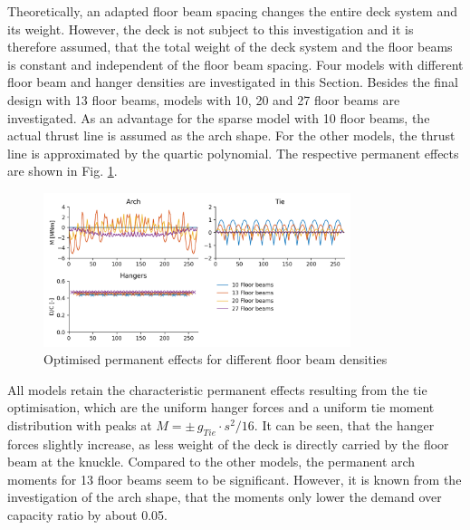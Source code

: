 Theoretically, an adapted floor beam spacing changes the entire deck system and its weight. However, the deck is not subject to this investigation and it is therefore assumed, that the total weight of the deck system and the floor beams is constant and independent of the floor beam spacing. Four models with different floor beam and hanger densities are investigated in this Section. Besides the final design with 13 floor beams, models with 10, 20 and 27 floor beams are investigated. As an advantage for the sparse model with 10 floor beams, the actual thrust line is assumed as the arch shape. For the other models, the thrust line is approximated by the quartic polynomial. The respective permanent effects are shown in Fig. \ref{fig:fb_permanent}.

\begin{figure}[H]
    \centering
    \includegraphics[width=0.8\textwidth]{calculations/floor beam comparison/permanent state.png}
    \caption{Optimised permanent effects for different floor beam densities}
    \label{fig:fb_permanent}
\end{figure}

All models retain the characteristic permanent effects resulting from the tie optimisation, which are the uniform hanger forces and a uniform tie moment distribution with peaks at $M=\pm\,g_{Tie} \cdot s^2 / 16$. It can be seen, that the hanger forces slightly increase, as less weight of the deck is directly carried by the floor beam at the knuckle. Compared to the other models, the permanent arch moments for 13 floor beams seem to be significant. However, it is known from the investigation of the arch shape, that the moments only lower the demand over capacity ratio by about 0.05. \medskip

